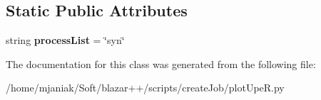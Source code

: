 \subsection*{Static Public Attributes}
\begin{DoxyCompactItemize}
\item 
\hypertarget{classplotUpeR_1_1plotUpeR_a64e0e3823ae8967e7178402e8e8b2e38}{string {\bfseries process\-List} = \char`\"{}syn\char`\"{}}\label{classplotUpeR_1_1plotUpeR_a64e0e3823ae8967e7178402e8e8b2e38}

\end{DoxyCompactItemize}


The documentation for this class was generated from the following file\-:\begin{DoxyCompactItemize}
\item 
/home/mjaniak/\-Soft/blazar++/scripts/create\-Job/plot\-Upe\-R.\-py\end{DoxyCompactItemize}
